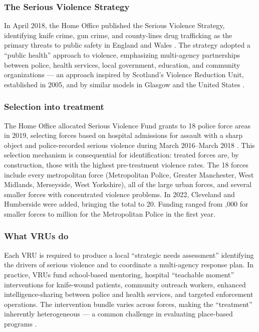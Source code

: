 \documentclass[12pt]{article}
\begin{document}
\subsubsection*{The Serious Violence Strategy} In April 2018, the Home Office published the Serious Violence Strategy, identifying knife crime, gun crime, and county-lines drug trafficking as the primary threats to public safety in England and Wales \citep{homeoffice2018svs}. The strategy adopted a ``public health'' approach to violence, emphasizing multi-agency partnerships between police, health services, local government, education, and community organizations --- an approach inspired by Scotland's Violence Reduction Unit, established in 2005, and by similar models in Glasgow and the United States \citep{deuchar2018gangs, butts2015cure}.

\subsubsection*{Selection into treatment} The Home Office allocated Serious Violence Fund grants to 18 police force areas in 2019, selecting forces based on hospital admissions for assault with a sharp object and police-recorded serious violence during March 2016--March 2018 \citep{homeoffice2019svf}. This selection mechanism is consequential for identification: treated forces are, by construction, those with the highest pre-treatment violence rates. The 18 forces include every metropolitan force (Metropolitan Police, Greater Manchester, West Midlands, Merseyside, West Yorkshire), all of the large urban forces, and several smaller forces with concentrated violence problems. In 2022, Cleveland and Humberside were added, bringing the total to 20. Funding ranged from ,000 for smaller forces to  million for the Metropolitan Police in the first year.

\subsubsection*{What VRUs do} Each VRU is required to produce a local ``strategic needs assessment'' identifying the drivers of serious violence and to coordinate a multi-agency response plan. In practice, VRUs fund school-based mentoring, hospital ``teachable moment'' interventions for knife-wound patients, community outreach workers, enhanced intelligence-sharing between police and health services, and targeted enforcement operations. The intervention bundle varies across forces, making the ``treatment'' inherently heterogeneous --- a common challenge in evaluating place-based programs \citep{kline2013place}.
\end{document}
